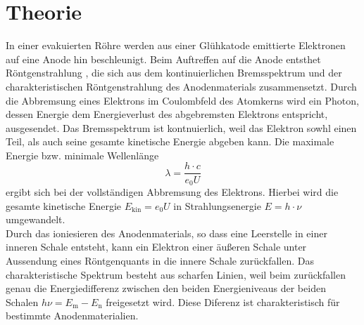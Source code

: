 \section{Theorie}
\label{sec:Theorie}
In einer evakuierten Röhre werden aus einer Glühkatode emittierte Elektronen auf eine Anode hin beschleunigt.
Beim Auftreffen auf die Anode entsthet Röntgenstrahlung , die sich aus dem kontinuierlichen Bremsspektrum
und der charakteristischen Röntgenstrahlung des Anodenmaterials zusammensetzt.
Durch die Abbremsung eines Elektrons im Coulombfeld des Atomkerns wird ein Photon,
dessen Energie dem Energieverlust des abgebremsten Elektrons entspricht,
ausgesendet.
Das Bremsspektrum ist kontnuierlich, weil das Elektron sowhl einen Teil, als auch seine gesamte kinetische Energie abgeben kann.
Die maximale Energie bzw. minimale Wellenlänge
\begin{equation}
    \lambda = \frac{h \cdot c}{e_0 U}
    \label{eqn:gl1}
\end{equation}
ergibt sich bei der vollständigen Abbremsung des Elektrons.
Hierbei wird die gesamte kinetische Energie $E_{\text{kin}} = e_0 U$ in Strahlungsenergie $E = h \cdot \nu$ umgewandelt.\\
\noindent
Durch das ioniesieren des Anodenmaterials, so dass eine Leerstelle in einer inneren Schale entsteht, kann ein Elektron einer äußeren Schale unter Aussendung eines Röntgenquants in die innere Schale zurückfallen.
Das charakteristische Spektrum besteht aus scharfen Linien, weil beim zurückfallen genau die Energiedifferenz zwischen den beiden Energieniveaus der beiden Schalen $h \nu = E_{\text{m}} - E_{\text{n}}$ freigesetzt wird.
Diese Diferenz ist charakteristisch für bestimmte Anodenmaterialien.